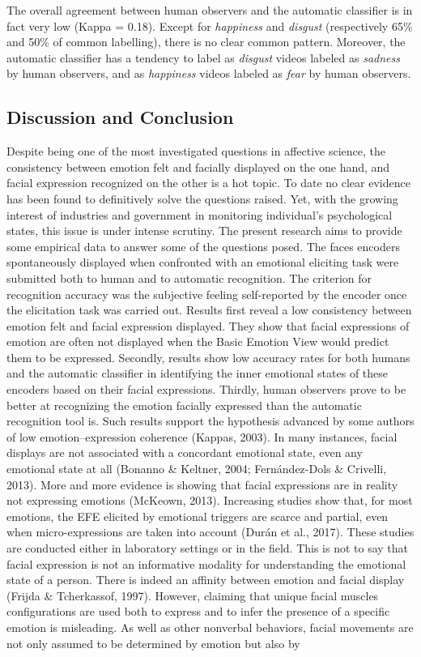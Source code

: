 \documentclass[
  english,
  doc]{apa7}
\begin{document}
The overall agreement between human observers and the automatic classifier is in fact very low (Kappa = 0.18). Except for \emph{happiness} and \emph{disgust} (respectively 65\% and 50\% of common labelling), there is no clear common pattern. Moreover, the automatic classifier has a tendency to label as \emph{disgust} videos labeled as \emph{sadness} by human observers, and as \emph{happiness} videos labeled as \emph{fear} by human observers.

\hypertarget{discussion-and-conclusion}{%
\subsection{Discussion and Conclusion}\label{discussion-and-conclusion}}

Despite being one of the most investigated questions in affective science, the consistency between emotion felt and facially displayed on the one hand, and facial expression recognized on the other is a hot topic. To date no clear evidence has been found to definitively solve the questions raised. Yet, with the growing interest of industries and government in monitoring individual's psychological states, this issue is under intense scrutiny. The present research aims to provide some empirical data to answer some of the questions posed. The faces encoders spontaneously displayed when confronted with an emotional eliciting task were submitted both to human and to automatic recognition. The criterion for recognition accuracy was the subjective feeling self-reported by the encoder once the elicitation task was carried out. Results first reveal a low consistency between emotion felt and facial expression displayed. They show that facial expressions of emotion are often not displayed when the Basic Emotion View would predict them to be expressed. Secondly, results show low accuracy rates for both humans and the automatic classifier in identifying the inner emotional states of these encoders based on their facial expressions. Thirdly, human observers prove to be better at recognizing the emotion facially expressed than the automatic recognition tool is. Such results support the hypothesis advanced by some authors of low emotion--expression coherence (Kappas, 2003). In many instances, facial displays are not associated with a concordant emotional state, even any emotional state at all (Bonanno \& Keltner, 2004; Fernández-Dols \& Crivelli, 2013). More and more evidence is showing that facial expressions are in reality not expressing emotions (McKeown, 2013). Increasing studies show that, for most emotions, the EFE elicited by emotional triggers are scarce and partial, even when micro-expressions are taken into account (Durán et al., 2017). These studies are conducted either in laboratory settings or in the field. This is not to say that facial expression is not an informative modality for understanding the emotional state of a person. There is indeed an affinity between emotion and facial display (Frijda \& Tcherkassof, 1997). However, claiming that unique facial muscles configurations are used both to express and to infer the presence of a specific emotion is misleading. As well as other nonverbal behaviors, facial movements are not only assumed to be determined by emotion but also by 
\end{document}
